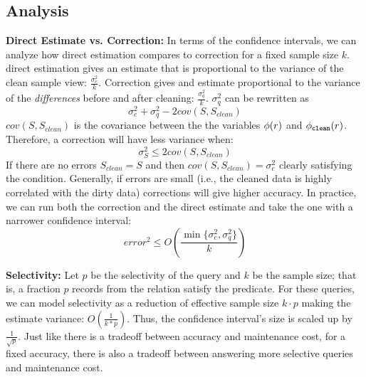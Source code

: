 \subsection{Analysis}
\noindent \textbf{Direct Estimate vs. Correction: } In terms of the confidence intervals, we can analyze how direct estimation compares to correction for a fixed sample size $k$.
\sloppy
direct estimation gives an estimate that is proportional to the variance of the clean sample view:  $\frac{\sigma_{c}^2}{k}$.
Correction gives and estimate proportional to the variance of the \emph{differences} before and after cleaning: $\frac{\sigma_{q}^2}{k}$.
$\sigma_{q}^2$ can be rewritten as
\[\sigma_{c}^2 + \sigma_{q}^2 - 2cov(S,S_{clean})\]
$cov(S,S_{clean})$ is the covariance between the the variables $\phi (r)$ and $\phi_{\texttt{clean} } (r)$.
Therefore, a correction will have less variance when:
\[\sigma_{S}^2 \le 2cov(S,S_{clean})\]
If there are no errors $S_{clean} = S$ and then $cov(S,S_{clean})=\sigma_c^2$ clearly satisfying the condition.
Generally, if errors are small (i.e., the cleaned data is highly correlated with the dirty data) corrections will give higher accuracy.
In practice, we can run both the correction and the direct estimate and take the one with a narrower confidence interval:
\begin{equation}
error^2 \le O(\frac{\min\{\sigma_c^2,\sigma_q^2\}}{k})
\end{equation}

\vspace{0.5em}

\noindent \textbf{Selectivity: }
Let $p$ be the selectivity of the query and $k$ be the sample size; that is, a fraction $p$ records from the relation satisfy the predicate.
For these queries, we can model selectivity as a reduction of effective sample size $k\cdot p$ making the
estimate variance: $O(\frac{1}{k*p})$.
Thus, the confidence interval's size is scaled up by $\frac{1}{\sqrt{p}}$.
Just like there is a tradeoff between accuracy and maintenance cost, for a fixed accuracy, 
there is also a tradeoff between answering more selective queries and maintenance cost.
